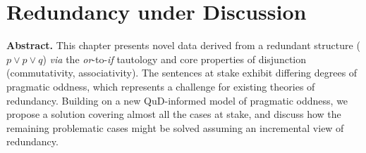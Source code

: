 \chapter{Redundancy under Discussion}\label{chap:redundancy}

\textbf{Abstract.} This chapter presents novel data derived from a redundant structure ($p\vee p \vee q$) \textit{via} the \textit{or}-to-\textit{if} tautology and core properties of disjunction (commutativity, associativity). The sentences at stake exhibit differing degrees of pragmatic oddness, which represents a challenge for existing theories of redundancy. Building on a new QuD-informed model of pragmatic oddness, we propose a solution covering almost all the cases at stake, and discuss how the remaining problematic cases might be solved assuming an incremental view of redundancy.


